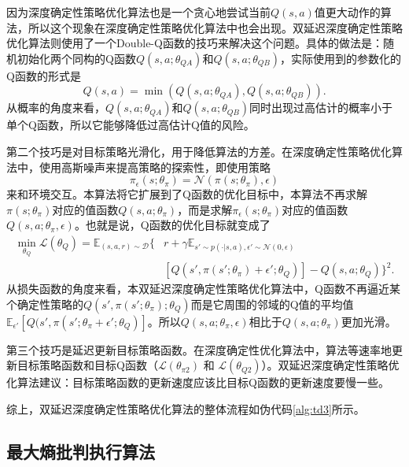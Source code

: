 因为深度确定性策略优化算法也是一个贪心地尝试当前$Q(s, a)$值更大动作的算法，所以这个现象在深度确定性策略优化算法中也会出现。双延迟深度确定性策略优化算法则使用了一个Double-Q函数的技巧来解决这个问题。具体的做法是：随机初始化两个同构的Q函数$Q(s, a;\theta_{QA})$和$Q(s, a; \theta_{QB})$，实际使用到的参数化的Q函数的形式是
\begin{equation}
    Q(s, a) = \min(Q(s, a;\theta_{QA}), Q(s, a; \theta_{QB})).
\end{equation}
从概率的角度来看，$Q(s, a; \theta_{QA})$和$Q(s, a; \theta_{QB})$同时出现过高估计的概率小于单个Q函数，所以它能够降低过高估计Q值的风险。

第二个技巧是对目标策略光滑化，用于降低算法的方差。在深度确定性策略优化算法中，使用高斯噪声来提高策略的探索性，即使用策略
\begin{equation}
    \pi_{\epsilon}(s;\theta_\pi) = \mathcal{N}(\pi(s;\theta_\pi), \epsilon)
\end{equation}
来和环境交互。本算法将它扩展到了Q函数的优化目标中，本算法不再求解$\pi(s;\theta_\pi)$对应的值函数$Q(s, a; \theta_\pi)$，而是求解$\pi_{\epsilon}(s; \theta_\pi)$对应的值函数$Q(s, a; \theta_\pi, \epsilon)$。也就是说，Q函数的优化目标就变成了
\begin{equation}
    \begin{aligned}
    \min_{\theta_Q} \mathcal{L}(\theta_Q) = \mathbb{E}_{(s, a, r) \sim \mathcal{D}} \{&r + \gamma \mathbb{E}_{s' \sim p(\cdot \vert s, a), \epsilon' \sim \mathcal{N}(0, \epsilon)} \\
    &[Q(s', \pi(s';\theta_\pi) + \epsilon'; \theta_Q)] - Q(s, a; \theta_Q)\}^2.
    \end{aligned}
\end{equation}
从损失函数的角度来看，本双延迟深度确定性策略优化算法中，Q函数不再逼近某个确定性策略的$Q(s', \pi(s';\theta_\pi);\theta_Q)$而是它周围的邻域的Q值的平均值$\mathbb{E}_{\epsilon'}[Q(s', \pi(s';\theta_\pi+\epsilon';\theta_Q)]$。所以$Q(s, a;\theta_\pi,\epsilon)$相比于$Q(s, a; \theta_\pi)$更加光滑。

第三个技巧是延迟更新目标策略函数。在深度确定性优化算法中，算法等速率地更新目标策略函数和目标Q函数（$\mathcal{L}(\theta_{\pi2})$ 和 $\mathcal{L}(\theta_{Q2})$）。双延迟深度确定性策略优化算法建议：目标策略函数的更新速度应该比目标Q函数的更新速度要慢一些。

综上，双延迟深度确定性策略优化算法的整体流程如伪代码\ref{alg:td3}所示。

\subsection{最大熵批判执行算法}


